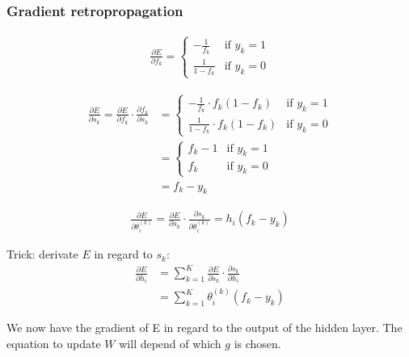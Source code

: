 \subsubsection*{Gradient retropropagation}


\begin{align}
	\frac{ \partial E } { \partial f_k } = 
		\left\{
		    \begin{array}{ll}
		        - \frac{1}{f_k} & \mbox{if } y_k =1 \\
		        \frac{1}{1 - f_k} & \mbox{if } y_k =0
		    \end{array}
		\right.
\end{align}


\begin{align}
	\frac{ \partial E } { \partial s_k } 
		=  
		\frac{ \partial E } { \partial f_k } \cdot \frac{ \partial f_k } { \partial s_k } 
		&=
		\left\{
		    \begin{array}{ll}
		        - \frac{1}{f_k} \cdot f_k (1 - f_k)& \mbox{if } y_k =1 \\
		        \frac{1}{1 - f_k} \cdot f_k (1 - f_k)& \mbox{if } y_k =0
		    \end{array}
		\right. \\
		&=
		\left\{
		    \begin{array}{ll}
		       f_k - 1 & \mbox{if } y_k =1 \\
		       f_k & \mbox{if } y_k =0
		    \end{array}
		\right. \\
		&= f_k - y_k
\end{align}



\begin{align}
	\frac{\partial E}{\partial \theta_i^{(k)}} 
	= 
	\frac{\partial E}{\partial s_k} \cdot \frac{\partial s_k}{\partial \theta_i^{(k)}} 
	= 
	h_i (f_k - y_k)
\end{align}


Trick: derivate $E$ in regard to $s_k$:
\begin{align}
	\frac{\partial E}{\partial h_i} 
	&= 
	\sum_{k=1}^K \frac{\partial E}{\partial s_k} \cdot \frac{\partial s_k}{\partial h_i} \\
	&= 
	\sum_{k=1}^K \theta_i^{(k)} (f_k - y_k)
\end{align}

We now have the gradient of E in regard to the output of the hidden layer. The equation to update $W$ will depend of which $g$ is chosen.
